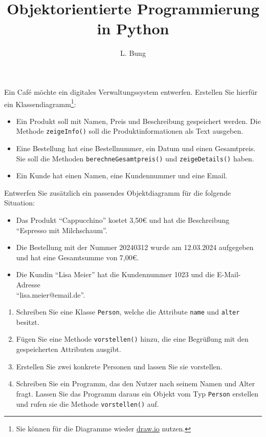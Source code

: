 \documentclass[11pt, a4paper, oneside]{article}
\begin{document}
	\author{L. Bung}
	\title{Objektorientierte \hspace{10cm} Programmierung in Python}
	\subject{SAE}
	\maketitle
	
	
	Ein Café möchte ein digitales Verwaltungssystem entwerfen.
	Erstellen Sie hierfür ein Klassendiagramm\footnote{Sie können für die Diagramme wieder \href{https://draw.io}{draw.io} nutzen.}:
	
	\begin{itemize}
		\item Ein Produkt soll mit Namen, Preis und Beschreibung gespeichert werden.
		Die Methode \texttt{zeigeInfo()} soll die Produktinformationen als Text ausgeben.
		\item Eine Bestellung hat eine Bestellnummer, ein Datum und einen Gesamtpreis.
		Sie soll die Methoden \texttt{berechneGesamtpreis()} und \texttt{zeigeDetails()} haben.
		\item Ein Kunde hat einen Namen, eine Kundennummer und eine Email.
	\end{itemize}

	Entwerfen Sie zusätzlich ein passendes Objektdiagramm für die folgende Situation:
	
	\begin{itemize}
		\item Das Produkt ``Cappucchino'' kostet 3,50€ und hat die Beschreibung ``Espresso mit Milchschaum''.
		\item Die Bestellung mit der Nummer 20240312 wurde am 12.03.2024 aufgegeben und hat eine Gesamtsumme von 7,00€.
		\item Die Kundin ``Lisa Meier'' hat die Kundennummer 1023 und die E-Mail-Adresse\\ ``lisa.meier@email.de''.
	\end{itemize}


	\begin{enumerate}[label=\alph*)]
		\item Schreiben Sie eine Klasse \texttt{Person}, welche die Attribute \texttt{name} und \texttt{alter} besitzt.
		\item Fügen Sie eine Methode \texttt{vorstellen()} hinzu, die eine Begrüßung mit den gespeicherten Attributen ausgibt.
		\item Erstellen Sie zwei konkrete Personen und lassen Sie sie vorstellen.
		\item Schreiben Sie ein Programm, das den Nutzer nach seinem Namen und Alter fragt.
		Lassen Sie das Programm daraus ein Objekt vom Typ \texttt{Person} erstellen und rufen sie die Methode \texttt{vorstellen()} auf.
	\end{enumerate}
\end{document}
